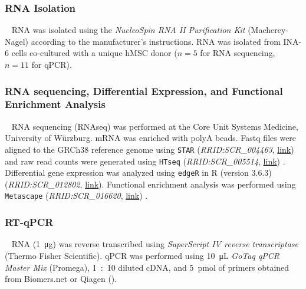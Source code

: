 \subsubsection*{RNA Isolation}
\ %
RNA was isolated using the \textit{NucleoSpin RNA II Purification Kit}
(Macherey-Nagel) according to the manufacturer's instructions. RNA was isolated
from INA-6 cells co-cultured with a unique hMSC donor ($n=5$ for RNA sequencing, $n=11$
for qPCR).

\subsubsection*{RNA sequencing, Differential Expression, and Functional Enrichment Analysis}
\ %
RNA sequencing (RNAseq) was performed at the Core Unit Systems Medicine,
University of Würzburg. mRNA was enriched with polyA beads. Fastq files were
aligned to the GRCh38 reference genome using \texttt{STAR}
(\textit{RRID:SCR\_004463},
\href{https://scicrunch.org/resolver/RRID:SCR_004463}{link}) and raw read
counts were generated using \texttt{HTseq} (\textit{RRID:SCR\_005514},
\href{https://scicrunch.org/resolver/SCR_005514}{link})
\cite{andersHTSeqPythonFramework2015,dobinSTARUltrafastUniversal2013,zerbinoEnsembl20182018}.
Differential gene expression was analyzed using \texttt{edgeR} in R (version
3.6.3) (\textit{RRID:SCR\_012802},
\href{https://scicrunch.org/resolver/SCR_012802}{link}). Functional
enrichment analysis was performed using \texttt{Metascape}
(\textit{RRID:SCR\_016620},
\href{https://scicrunch.org/resolver/SCR_016620}{link})
\cite{zhouMetascapeProvidesBiologistoriented2019}.


\subsubsection*{RT-qPCR}
\ %
RNA (\SI{1}{\micro\gram}) was reverse transcribed using \textit{SuperScript IV
    reverse transcriptase} (Thermo Fisher Scientific). qPCR was performed using
\SI{10}{\micro\liter} \textit{GoTaq qPCR Master Mix} (Promega), \SI{1}{:10}
diluted cDNA, and \SI{5}{pmol} of primers obtained from Biomers.net or Qiagen
().


